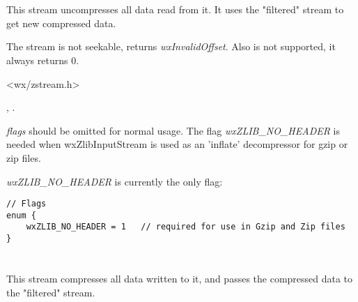 \section{}\label{wxzlibinputstream}

This stream uncompresses all data read from it. It uses the "filtered"
stream to get new compressed data.

The stream is not seekable,  returns
 {\it wxInvalidOffset}. Also  is
not supported, it always returns $0$.




<wx/zstream.h>


, 
 .




{\it flags} should be omitted for normal usage. The flag {\it wxZLIB\_NO_HEADER}
 is needed when wxZlibInputStream is used as an 'inflate' decompressor for gzip
or zip files.

{\it wxZLIB\_NO_HEADER} is currently the only flag:

\begin{verbatim}
// Flags
enum {
    wxZLIB_NO_HEADER = 1   // required for use in Gzip and Zip files
}
\end{verbatim}


\section{}\label{wxzliboutputstream}

This stream compresses all data written to it, and passes the compressed data
to the "filtered" stream.

